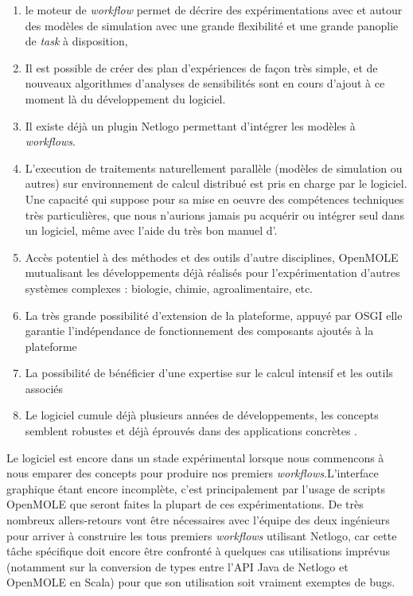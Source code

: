 \begin{enumerate}[label=(\alph*),labelindent=\parindent,leftmargin=*]
\item le moteur de \textit{workflow} permet de décrire des expérimentations avec et autour des modèles de simulation avec une grande flexibilité et une grande panoplie de \textit{task} à disposition,
\item Il est possible de créer des plan d'expériences de façon très simple, et de nouveaux algorithmes d'analyses de sensibilités sont en cours d'ajout à ce moment là du développement du logiciel.
\item Il existe déjà un plugin Netlogo permettant d'intégrer les modèles à \textit{workflows}.
\item L'execution de traitements naturellement parallèle (modèles de simulation ou autres) sur environnement de calcul distribué est pris en charge par le logiciel. Une capacité qui suppose pour sa mise en oeuvre des compétences techniques très particulières, que nous n'aurions jamais pu acquérir ou intégrer seul dans un logiciel, même avec l'aide du très bon manuel d'\textcite{Openshaw2000}.
\item Accès potentiel à des méthodes et des outils d'autre disciplines, OpenMOLE mutualisant les développements déjà réalisés pour l'expérimentation d'autres systèmes complexes : biologie, chimie, agroalimentaire, etc.
\item La très grande possibilité d'extension de la plateforme, appuyé par OSGI elle garantie l'indépendance de fonctionnement des composants ajoutés à la plateforme
\item La possibilité de bénéficier d'une expertise sur le calcul intensif et les outils associés
\item Le logiciel cumule déjà plusieurs années de développements, les concepts semblent robustes et déjà éprouvés dans des applications concrètes \autocite{Mesmoudi2010}.
\end{enumerate}

Le logiciel est encore dans un stade expérimental lorsque nous commencons à nous emparer des concepts pour produire nos premiers \textit{workflows}.L'interface graphique étant encore incomplète, c'est principalement par l'usage de scripts OpenMOLE que seront faites la plupart de ces expérimentations. De très nombreux allers-retours vont être nécessaires avec l'équipe des deux ingénieurs pour arriver à construire les tous premiers \textit{workflows} utilisant Netlogo, car cette tâche spécifique doit encore être confronté à quelques cas utilisations imprévus (notamment sur la conversion de types entre l'API Java de Netlogo et OpenMOLE en Scala) pour que son utilisation soit vraiment exemptes de bugs. 

